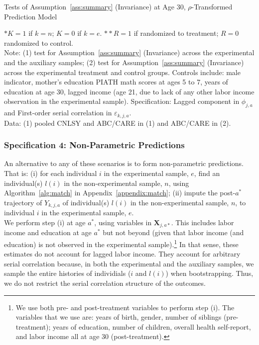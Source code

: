 \begin{table}[H] 
\begin{threeparttable}
\caption{Tests of Assumption~\ref{ass:summary} (Invariance) at Age 30, $\rho$-Transformed Prediction Model}
\label{table:invariance}
\centering 

\end{threeparttable}
\end{table}
\begin{spacing}{1}
\begin{footnotesize}
\noindent $* K= 1$ if $k = n$; $K = 0$ if $k = e$. $** R= 1$ if randomized to treatment; $R = 0$ randomized to control. \\ 
\noindent Note: (1) test for Assumption~\ref{ass:summary} (Invariance) across the experimental and the auxiliary samples; (2) test for Assumption~\ref{ass:summary} (Invariance) across the experimental treatment and control groups. Controls include: male indicator, mother's education PIATH math scores at ages 5 to 7, years of education at age 30, lagged income (age 21, due to lack of any other labor income observation in the experimental sample).
\noindent Specification: Lagged component in $\phi_{j,a}$ and First-order serial correlation in $\varepsilon_{k,j,a}$.\\ 
\noindent Data: (1) pooled CNLSY and ABC/CARE in (1) and ABC/CARE in (2). 
\end{footnotesize}
\end{spacing}

\subsubsection{Specification 4: Non-Parametric Predictions}

\noindent An alternative to any of these scenarios is to form non-parametric predictions. That is: (i) for each individual $i$ in the experimental sample, $e$, find an individual(s) $l(i)$ in the non-experimental sample, $n$, using Algorithm~\ref{alg:match} in Appendix~\ref{appendix:match}; (ii) impute the post-$a^*$ trajectory of $Y_{k,j,a}$ of individual(s) $l(i)$ in the non-experimental sample, $n$, to individual $i$ in the experimental sample, $e$.\\ 

\noindent We perform step (i) at age $a^*$, using variables in $\bm{X}_{j,a*}$. This includes labor income and education at age $a^*$ but not beyond (given that labor income (and education) is not observed in the experimental sample).\footnote{We use both pre- and post-treatment variables to perform step (i). The variables that we use are: years of birth, gender, number of siblings (pre-treatment); years of education, number of children, overall health self-report, and labor income all at age 30 (post-treatment).} In that sense, these estimates do not account for lagged labor income. They account for arbitrary serial correlation because, in both the experimental and the auxiliary samples, we sample the entire histories of individials ($i$ and $l(i)$) when bootstrapping. Thus, we do not restrict the serial correlation structure of the outcomes.\\



\singlespace






